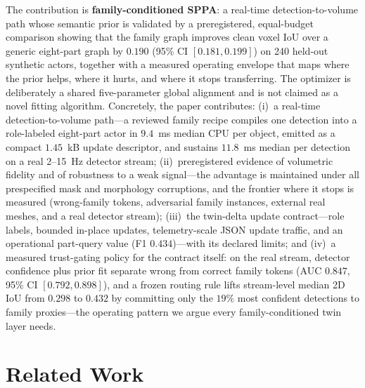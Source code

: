 \documentclass[11pt,a4paper]{article}
\begin{document}
The contribution is \textbf{family-conditioned SPPA}: a real-time
detection-to-volume path whose semantic prior is validated by a
preregistered, equal-budget comparison showing that the family graph
improves clean voxel IoU over a generic eight-part graph by \(0.190\) (95\%
CI \([0.181,0.199]\)) on 240 held-out synthetic actors, together with a
measured operating envelope that maps where the prior helps, where it hurts,
and where it stops transferring. The optimizer is deliberately a shared
five-parameter global alignment and is not claimed as a novel fitting
algorithm.
Concretely, the paper contributes: (i)~a real-time detection-to-volume
path---a reviewed family recipe compiles one detection into a role-labeled
eight-part actor in \(9.4\)~ms median CPU per object, emitted as a compact
\(1.45\)~kB update descriptor, and sustains \(11.8\)~ms median per detection
on a real 2--15~Hz detector stream; (ii)~preregistered evidence of volumetric
fidelity and of robustness to a weak signal---the advantage
is maintained under all prespecified mask and morphology
corruptions, and the frontier where it stops is measured (wrong-family
tokens, adversarial family instances, external real meshes, and a real
detector stream); (iii)~the twin-delta update contract---role labels,
bounded in-place updates, telemetry-scale JSON update traffic, and an
operational part-query
value (F1 \(0.434\))---with its declared limits; and (iv)~a measured
trust-gating policy for the contract itself: on the real stream, detector
confidence plus prior fit separate wrong from correct family tokens (AUC
\(0.847\), 95\% CI \([0.792,0.898]\)), and a frozen routing rule lifts
stream-level median 2D IoU from \(0.298\) to \(0.432\) by committing only
the \(19\%\) most confident detections to family proxies---the operating
pattern we argue every family-conditioned twin layer needs.

\section{Related Work}
\end{document}
